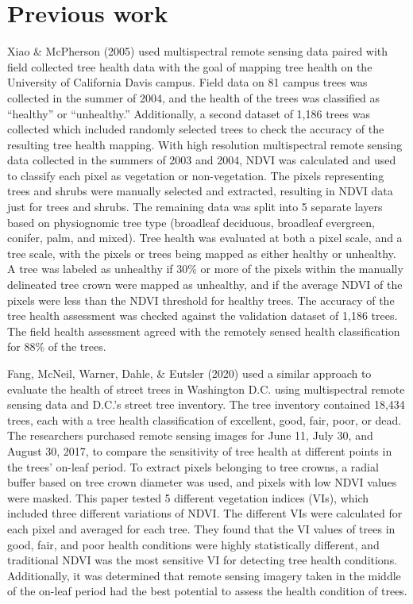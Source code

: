 \documentclass[12pt,twoside]{reedthesis}
\begin{document}
\hypertarget{previous-work}{%
\section{Previous work}\label{previous-work}}

Xiao \& McPherson (2005) used multispectral remote sensing data paired with field collected tree health data with the goal of mapping tree health on the University of California Davis campus. Field data on 81 campus trees was collected in the summer of 2004, and the health of the trees was classified as ``healthy'' or ``unhealthy.'' Additionally, a second dataset of 1,186 trees was collected which included randomly selected trees to check the accuracy of the resulting tree health mapping. With high resolution multispectral remote sensing data collected in the summers of 2003 and 2004, NDVI was calculated and used to classify each pixel as vegetation or non-vegetation. The pixels representing trees and shrubs were manually selected and extracted, resulting in NDVI data just for trees and shrubs. The remaining data was split into 5 separate layers based on physiognomic tree type (broadleaf deciduous, broadleaf evergreen, conifer, palm, and mixed). Tree health was evaluated at both a pixel scale, and a tree scale, with the pixels or trees being mapped as either healthy or unhealthy. A tree was labeled as unhealthy if 30\% or more of the pixels within the manually delineated tree crown were mapped as unhealthy, and if the average NDVI of the pixels were less than the NDVI threshold for healthy trees. The accuracy of the tree health assessment was checked against the validation dataset of 1,186 trees. The field health assessment agreed with the remotely sensed health classification for 88\% of the trees.

Fang, McNeil, Warner, Dahle, \& Eutsler (2020) used a similar approach to evaluate the health of street trees in Washington D.C. using multispectral remote sensing data and D.C.'s street tree inventory. The tree inventory contained 18,434 trees, each with a tree health classification of excellent, good, fair, poor, or dead. The researchers purchased remote sensing images for June 11, July 30, and August 30, 2017, to compare the sensitivity of tree health at different points in the trees' on-leaf period. To extract pixels belonging to tree crowns, a radial buffer based on tree crown diameter was used, and pixels with low NDVI values were masked. This paper tested 5 different vegetation indices (VIs), which included three different variations of NDVI. The different VIs were calculated for each pixel and averaged for each tree. They found that the VI values of trees in good, fair, and poor health conditions were highly statistically different, and traditional NDVI was the most sensitive VI for detecting tree health conditions. Additionally, it was determined that remote sensing imagery taken in the middle of the on-leaf period had the best potential to assess the health condition of trees.
\end{document}

